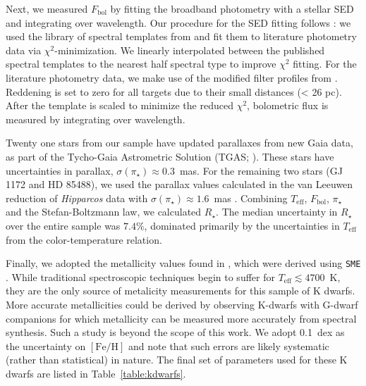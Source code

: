 \documentclass[preprint2]{aastex6}
\newcommand{\chisq}{\ensuremath{\chi^2}\xspace}
\newcommand{\Rstar}{\ensuremath{R_{\star}}\xspace}
\newcommand{\fe}{\ensuremath{\mathrm{[Fe/H]}}\xspace}
\newcommand{\teff}{\ensuremath{T_{\mathrm{eff}}}\xspace}
\newcommand{\Fbol}{\ensuremath{F_{\mathrm{bol}}}\xspace}
\newcommand{\plx}{\ensuremath{\pi_\star}\xspace}
\begin{document}
Next, we measured \Fbol by fitting the broadband photometry with a stellar SED and integrating over wavelength. Our procedure for the SED fitting follows \citet{VonBraun14}: we used the library of spectral templates from \citet{Pickles1998} and fit them to literature photometry data via \chisq-minimization. We linearly interpolated between the published spectral templates to the nearest half spectral type to improve \chisq fitting. For the literature photometry data, we make use of the modified filter profiles from \citet{Mann2015b}. Reddening is set to zero for all targets due to their small distances (< 26 pc). After the template is scaled to minimize the reduced $\chi^2$, bolometric flux is measured by integrating over wavelength.

Twenty one stars from our sample have updated parallaxes from new Gaia data, as part of the Tycho-Gaia Astrometric Solution (TGAS; \citealt{Gaia16a,Lindegren2016,Michalik2015}). These stars have uncertainties in parallax, $\sigma(\plx) \approx 0.3$~mas. For the remaining two stars (GJ 1172 and HD 85488), we used the parallax values calculated in the van Leeuwen reduction of {\em Hipparcos} data with $\sigma(\plx)\approx1.6$~mas \citep{Perryman97,VanLeeuwen07}. Combining \teff, \Fbol, \plx and the Stefan-Boltzmann law, we calculated \Rstar. The median uncertainty in \Rstar over the entire sample was $7.4\%$, dominated primarily by the uncertainties in \teff from the color-temperature relation. 

Finally, we adopted the metallicity values found in \cite{Gaidos13}, which were derived using \texttt{SME} \citep{Valenti96}. While traditional spectroscopic techniques begin to suffer for $\teff \lesssim 4700$~K, they are the only source of metalicity measurements for this sample of K dwarfs. More accurate metallicities could be derived by observing K-dwarfs with G-dwarf companions for which metallicity can be measured more accurately from spectral synthesis. Such a study is beyond the scope of this work. We adopt 0.1~dex as the uncertainty on \fe and note that such errors are likely systematic (rather than statistical) in nature. The final set of parameters used for these K dwarfs are listed in Table~\ref{table:kdwarfs}.
\end{document}
